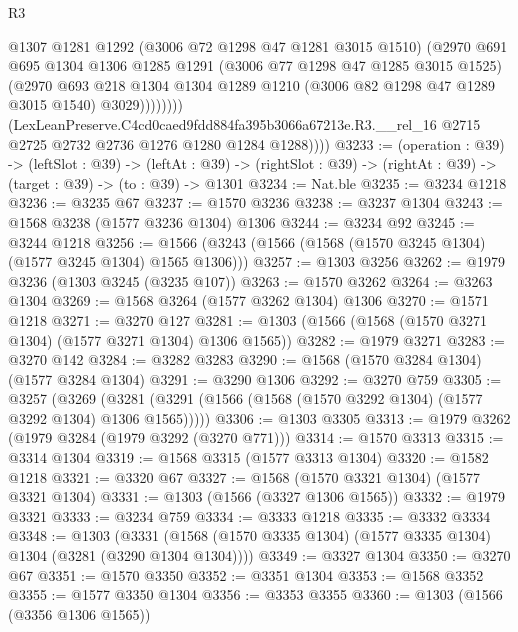 \begin{lexlean}{R3}
\begin{coremodule}
                      @1307
                      @1281
                      @1292
                      (@3006 @72 @1298 @47 @1281 @3015 @1510)
                      (@2970
                        @691
                        @695
                        @1304
                        @1306
                        @1285
                        @1291
                        (@3006 @77 @1298 @47 @1285 @3015 @1525)
                        (@2970
                          @693
                          @218
                          @1304
                          @1304
                          @1289
                          @1210
                          (@3006 @82 @1298 @47 @1289 @3015 @1540)
                          @3029))))))))
          (LexLeanPreserve.C4cd0caed9fdd884fa395b3066a67213e.R3.__rel_16
            @2715
            @2725
            @2732
            @2736
            @1276
            @1280
            @1284
            @1288))))
@3233 := (operation : @39) ->
  (leftSlot : @39) ->
  (leftAt : @39) -> (rightSlot : @39) -> (rightAt : @39) -> (target : @39) -> (to : @39) -> @1301
@3234 := Nat.ble
@3235 := @3234 @1218
@3236 := @3235 @67
@3237 := @1570 @3236
@3238 := @3237 @1304
@3243 := @1568 @3238 (@1577 @3236 @1304) @1306
@3244 := @3234 @92
@3245 := @3244 @1218
@3256 := @1566 (@3243 (@1566 (@1568 (@1570 @3245 @1304) (@1577 @3245 @1304) @1565 @1306)))
@3257 := @1303 @3256
@3262 := @1979 @3236 (@1303 @3245 (@3235 @107))
@3263 := @1570 @3262
@3264 := @3263 @1304
@3269 := @1568 @3264 (@1577 @3262 @1304) @1306
@3270 := @1571 @1218
@3271 := @3270 @127
@3281 := @1303 (@1566 (@1568 (@1570 @3271 @1304) (@1577 @3271 @1304) @1306 @1565))
@3282 := @1979 @3271
@3283 := @3270 @142
@3284 := @3282 @3283
@3290 := @1568 (@1570 @3284 @1304) (@1577 @3284 @1304)
@3291 := @3290 @1306
@3292 := @3270 @759
@3305 := @3257
    (@3269 (@3281 (@3291 (@1566 (@1568 (@1570 @3292 @1304) (@1577 @3292 @1304) @1306 @1565)))))
@3306 := @1303 @3305
@3313 := @1979 @3262 (@1979 @3284 (@1979 @3292 (@3270 @771)))
@3314 := @1570 @3313
@3315 := @3314 @1304
@3319 := @1568 @3315 (@1577 @3313 @1304)
@3320 := @1582 @1218
@3321 := @3320 @67
@3327 := @1568 (@1570 @3321 @1304) (@1577 @3321 @1304)
@3331 := @1303 (@1566 (@3327 @1306 @1565))
@3332 := @1979 @3321
@3333 := @3234 @759
@3334 := @3333 @1218
@3335 := @3332 @3334
@3348 := @1303
    (@3331 (@1568 (@1570 @3335 @1304) (@1577 @3335 @1304) @1304 (@3281 (@3290 @1304 @1304))))
@3349 := @3327 @1304
@3350 := @3270 @67
@3351 := @1570 @3350
@3352 := @3351 @1304
@3353 := @1568 @3352
@3355 := @1577 @3350 @1304
@3356 := @3353 @3355
@3360 := @1303 (@1566 (@3356 @1306 @1565))

\end{coremodule}
\end{lexlean}
